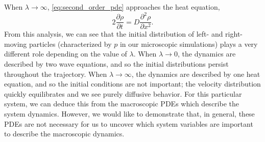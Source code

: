 \documentclass[prl, reprint, final, showkeys]{revtex4-1}
\begin{document}
When $\lambda \rightarrow \infty$, \eqref{eq:second_order_pde} approaches the heat equation,
\begin{equation}
2 \frac{\partial \rho}{\partial t} = D \frac{\partial ^2 \rho}{\partial x^2}.
\end{equation}
%
From this analysis, we can see that the initial distribution of left- and right-moving particles (characterized by $p$ in our microscopic simulations) plays a very different role depending on the value of $\lambda$.
%
When $\lambda \rightarrow 0$, the dynamics are described by two wave equations, and so the initial distributions persist throughout the trajectory.
%
When $\lambda \rightarrow \infty$, the dynamics are described by one heat equation, and so the initial conditions are not important; the velocity distribution quickly equilibrates and we see purely diffusive behavior.
%
For this particular system, we can deduce this from the macroscopic PDEs which describe the system dynamics.
%
However, we would like to demonstrate that, in general, these PDEs are not necessary for us to uncover which system variables are important to describe the macroscopic dynamics.
 


\end{document}
